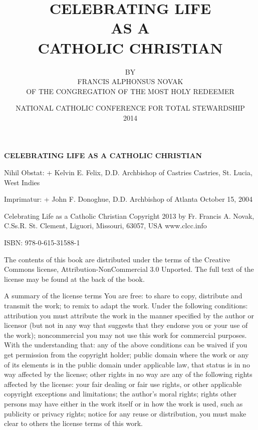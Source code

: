 \documentclass[oneside]{book}
\title{\textbf{CELEBRATING LIFE} \\ AS A \\ \textbf{CATHOLIC CHRISTIAN}}
\author{{\small BY} \\ FRANCIS ALPHONSUS NOVAK \\
        {\small OF THE CONGREGATION OF THE MOST HOLY REDEEMER}}
\date{\vfill
      {\small NATIONAL CATHOLIC CONFERENCE FOR TOTAL STEWARDSHIP \\ 2014}
      \clearpage}
\begin{document}
\pagestyle{plain}


\frontmatter

\setcounter{secnumdepth}{-1}
\section*{} 

\vspace*{\fill}
\begin{center}

{\large \textbf{CELEBRATING LIFE AS A CATHOLIC CHRISTIAN}}

\end{center}
\vspace*{\fill}
\pagebreak


Nihil Obstat: + Kelvin E. Felix, D.D.  Archbishop of Castries Castries,
St. Lucia, West Indies

Imprimatur: + John F. Donoghue, D.D.  Archbishop of Atlanta October 15, 2004

Celebrating Life as a Catholic Christian Copyright 2013 by Fr. Francis A. Novak,
C.Ss.R.  St. Clement, Liguori, Missouri, 63057, USA www.clcc.info

ISBN: 978-0-615-31588-1

The contents of this book are distributed under the terms of the Creative
Commons license, Attribution-NonCommercial 3.0 Unported. The full text of the
license may be found at the back of the book.

A summary of the license terms You are free: to share to copy, distribute and
transmit the work; to remix to adapt the work. Under the following conditions:
attribution you must attribute the work in the manner specified by the author or
licensor (but not in any way that suggests that they endorse you or your use of
the work); noncommercial you may not use this work for commercial purposes. With
the understanding that: any of the above conditions can be waived if you get
permission from the copyright holder; public domain where the work or any of its
elements is in the public domain under applicable law, that status is in no way
affected by the license; other rights in no way are any of the following rights
affected by the license: your fair dealing or fair use rights, or other
applicable copyright exceptions and limitations; the author's moral rights;
rights other persons may have either in the work itself or in how the work is
used, such as publicity or privacy rights; notice for any reuse or distribution,
you must make clear to others the license terms of this work.
\end{document}
